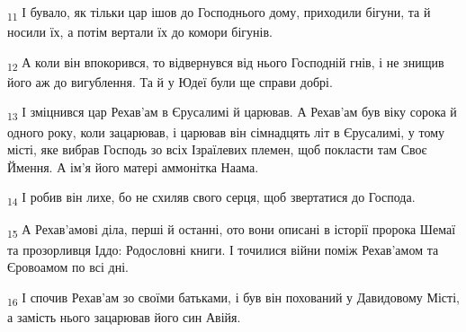 \begin{tcolorbox}
\textsubscript{11} І бувало, як тільки цар ішов до Господнього дому, приходили бігуни, та й носили їх, а потім вертали їх до комори бігунів.
\end{tcolorbox}
\begin{tcolorbox}
\textsubscript{12} А коли він впокорився, то відвернувся від нього Господній гнів, і не знищив його аж до вигублення. Та й у Юдеї були ще справи добрі.
\end{tcolorbox}
\begin{tcolorbox}
\textsubscript{13} І зміцнився цар Рехав'ам в Єрусалимі й царював. А Рехав'ам був віку сорока й одного року, коли зацарював, і царював він сімнадцять літ в Єрусалимі, у тому місті, яке вибрав Господь зо всіх Ізраїлевих племен, щоб покласти там Своє Ймення. А ім'я його матері аммонітка Наама.
\end{tcolorbox}
\begin{tcolorbox}
\textsubscript{14} І робив він лихе, бо не схиляв свого серця, щоб звертатися до Господа.
\end{tcolorbox}
\begin{tcolorbox}
\textsubscript{15} А Рехав'амові діла, перші й останні, ото вони описані в історії пророка Шемаї та прозорливця Іддо: Родословні книги. І точилися війни поміж Рехав'амом та Єровоамом по всі дні.
\end{tcolorbox}
\begin{tcolorbox}
\textsubscript{16} І спочив Рехав'ам зо своїми батьками, і був він похований у Давидовому Місті, а замість нього зацарював його син Авійя.
\end{tcolorbox}
